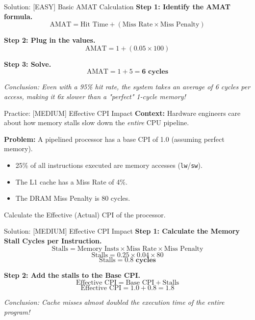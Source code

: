 \documentclass[aspectratio=169]{beamer}
\begin{document}
\begin{frame}{Solution: [EASY] Basic AMAT Calculation}
\textbf{Step 1: Identify the AMAT formula.}
\[ \text{AMAT} = \text{Hit Time} + (\text{Miss Rate} \times \text{Miss Penalty}) \]

\vspace{0.5cm}
\textbf{Step 2: Plug in the values.}
\[ \text{AMAT} = 1 + (0.05 \times 100) \]

\vspace{0.5cm}
\textbf{Step 3: Solve.}
\[ \text{AMAT} = 1 + 5 = \mathbf{6 \text{ cycles}} \]

\vspace{0.5cm}
\textit{Conclusion: Even with a 95\% hit rate, the system takes an average of 6 cycles per access, making it 6x slower than a "perfect" 1-cycle memory!}
\end{frame}

\begin{frame}{Practice: [MEDIUM] Effective CPI Impact}
\textbf{Context:} Hardware engineers care about how memory stalls slow down the \textit{entire} CPU pipeline.

\vspace{0.5cm}
\textbf{Problem:} 
A pipelined processor has a base CPI of 1.0 (assuming perfect memory). 
\begin{itemize}
    \item 25\% of all instructions executed are memory accesses (\texttt{lw}/\texttt{sw}). 
    \item The L1 cache has a Miss Rate of 4\%.
    \item The DRAM Miss Penalty is 80 cycles. 
\end{itemize}

\vspace{0.5cm}
Calculate the Effective (Actual) CPI of the processor.
\end{frame}

\begin{frame}{Solution: [MEDIUM] Effective CPI Impact}
\textbf{Step 1: Calculate the Memory Stall Cycles per Instruction.}
\[ \text{Stalls} = \text{Memory Insts} \times \text{Miss Rate} \times \text{Miss Penalty} \]
\[ \text{Stalls} = 0.25 \times 0.04 \times 80 \]
\[ \text{Stalls} = \mathbf{0.8 \text{ cycles}} \]

\vspace{0.5cm}
\textbf{Step 2: Add the stalls to the Base CPI.}
\[ \text{Effective CPI} = \text{Base CPI} + \text{Stalls} \]
\[ \text{Effective CPI} = 1.0 + 0.8 = \mathbf{1.8} \]

\vspace{0.5cm}
\textit{Conclusion: Cache misses almost doubled the execution time of the entire program!}
\end{frame}
\end{document}
